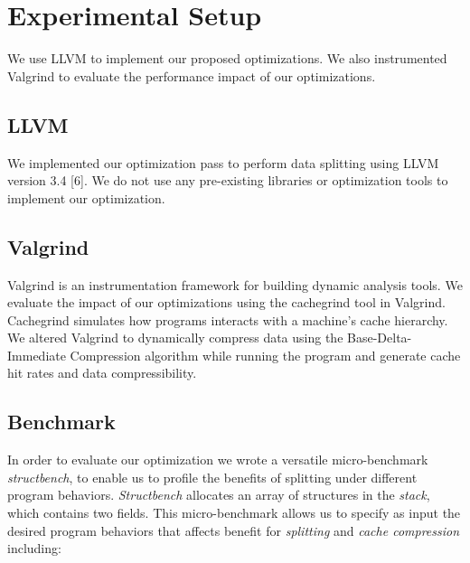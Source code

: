 \section{Experimental Setup}
\label{sec:exp}

We use LLVM to implement our proposed optimizations. We also instrumented
Valgrind to evaluate the performance impact of our optimizations.

\subsection{LLVM}
\label{sec:exp-llvm}

We implemented our optimization pass to perform data splitting using LLVM
version 3.4 [6]. We do not use any pre-existing libraries or optimization tools
to implement our optimization. 

\subsection{Valgrind}
\label{sec:exp-val}

Valgrind is an instrumentation framework for building dynamic analysis tools. We
evaluate the impact of our optimizations using the cachegrind tool in Valgrind.
Cachegrind simulates how programs interacts with a machine's cache hierarchy. We
altered Valgrind to dynamically compress data using the Base-Delta-Immediate
Compression algorithm while running the program and generate cache hit rates and
data compressibility. 

\subsection{Benchmark}
\label{sec:exp-ben}

In order to evaluate our optimization we wrote a versatile micro-benchmark {\em
structbench}, to enable us to profile the benefits of splitting under different
program behaviors. {\em Structbench} allocates an array of structures in the
{\em stack}, which contains two fields. This micro-benchmark allows us to
specify as input the desired program behaviors that affects benefit for {\em
splitting} and {\em cache compression} including:

\squishlist

